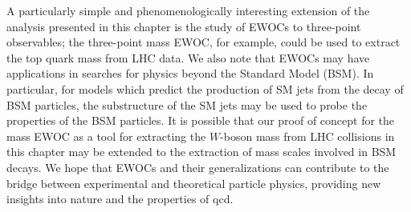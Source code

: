 A particularly simple and phenomenologically interesting extension of the analysis presented in this chapter is the study of EWOCs to three-point observables;
%
the three-point mass EWOC, for example, could be used to extract the top quark mass from LHC data.
%
We also note that EWOCs may have applications in searches for physics beyond the Standard Model (BSM).
%
In particular, for models which predict the production of SM jets from the decay of BSM particles, the substructure of the SM jets may be used to probe the properties of the BSM particles.
%
It is possible that our proof of concept for the mass EWOC as a tool for extracting the \(W\)-boson mass from LHC collisions in this chapter may be extended to the extraction of mass scales involved in BSM decays.
%
We hope that EWOCs and their generalizations can contribute to the bridge between experimental and theoretical particle physics, providing new insights into nature and the properties of \gls{qcd}.





